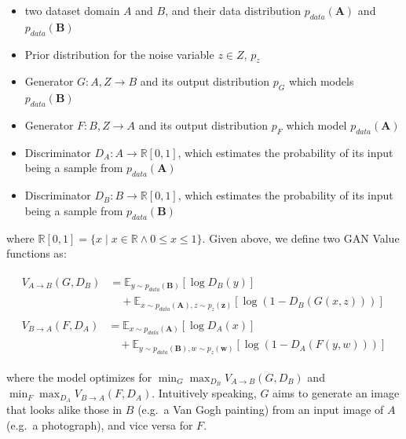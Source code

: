 \documentclass[]{report}
\providecommand{\tightlist}{%
  \setlength{\itemsep}{0pt}\setlength{\parskip}{0pt}}
\begin{document}
\begin{itemize}
\tightlist
\item
  two dataset domain \(A\) and \(B\), and their data distribution
  \(p_{data}(\mathbf{A})\) and \(p_{data}(\mathbf{B})\)
\item
  Prior distribution for the noise variable \(z \in Z\), \(p_z\)
\item
  Generator \(G: A, Z \rightarrow B\) and its output distribution
  \(p_G\) which models \(p_{data}(\mathbf{B})\)
\item
  Generator \(F: B, Z \rightarrow A\) and its output distribution
  \(p_F\) which model \(p_{data}(\mathbf{A})\)
\item
  Discriminator \(D_{A}: A \rightarrow \mathbb{R}[0, 1]\), which
  estimates the probability of its input being a sample from
  \(p_{data}(\mathbf{A})\)
\item
  Discriminator \(D_{B}: B \rightarrow \mathbb{R}[0, 1]\), which
  estimates the probability of its input being a sample from
  \(p_{data}(\mathbf{B})\)
\end{itemize}

where
\(\mathbb{R}[0, 1] = \{x \mid x \in \mathbb{R} \land 0 \leq x \leq 1 \}\).
Given above, we define two GAN Value functions as:

\begin{align}
    \begin{split}
        V_{A \rightarrow B}(G, D_B) &= \mathbb{E}_{y \sim p_{data}(\mathbf{B})}[ \log D_B(y)]  \\
        &\quad + \mathbb{E}_{x \sim p_{data}(\mathbf{A}), z \sim p_{z}(\mathbf{z})} [\log (1 - D_B(G(x, z)))] \label{eq:cyclegan_1}
    \end{split} \\
    \begin{split}
        V_{B \rightarrow A}(F, D_A) &= \mathbb{E}_{x \sim p_{data}(\mathbf{A})}[ \log D_A(x)]  \\
        &\quad + \mathbb{E}_{y \sim p_{data}(\mathbf{B}), w \sim p_{z}(\mathbf{w})} [\log (1 - D_A(F(y, w)))] \label{eq:cyclegan_2}
    \end{split} 
\end{align}

where the model optimizes for
\(\displaystyle \min_G \max_{D_B} V_{A \rightarrow B}(G, D_B)\) and
\(\displaystyle \min_F \max_{D_A} V_{B \rightarrow A}(F, D_A)\).
Intuitively speaking, \(G\) aims to generate an image that looks alike
those in \(B\) (e.g.~a Van Gogh painting) from an input image of \(A\)
(e.g.~a photograph), and vice versa for \(F\).
\end{document}
